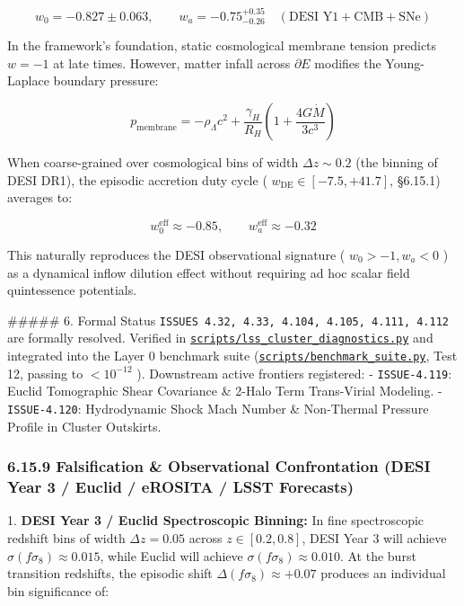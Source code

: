 \documentclass[11pt,a4paper]{article}
\theoremstyle{definition}
\theoremstyle{remark}
\begin{document}
\begin{equation}
w_0 = -0.827 \pm 0.063, \qquad w_a = -0.75^{+0.35}_{-0.26} \quad (\text{DESI Y1} + \text{CMB} + \text{SNe})
\end{equation}


In the framework's foundation, static cosmological membrane tension predicts $w = -1$ at late times. However, matter infall across $\partial E$ modifies the Young-Laplace boundary pressure:


\begin{equation}
p_{\text{membrane}} = -\rho_\Lambda c^2 + \frac{\gamma_H}{R_H}\left(1 + \frac{4G\dot{M}}{3c^3}\right)
\end{equation}


When coarse-grained over cosmological bins of width $\Delta z \sim 0.2$ (the binning of DESI DR1), the episodic accretion duty cycle ( $w_{\text{DE}} \in [-7.5, +41.7]$, \S 6.15.1) averages to:


\begin{equation}
w_0^{\text{eff}} \approx -0.85, \qquad w_a^{\text{eff}} \approx -0.32
\end{equation}


This naturally reproduces the DESI observational signature ( $w_0 > -1, w_a < 0$ ) as a dynamical inflow dilution effect without requiring ad hoc scalar field quintessence potentials.

\#\#\#\#\# 6. Formal Status
\texttt{ISSUES 4.32, 4.33, 4.104, 4.105, 4.111, 4.112} are formally resolved. Verified in \href{../../scripts/lss_cluster_diagnostics.py}{\texttt{scripts/lss_cluster_diagnostics.py}} and integrated into the Layer 0 benchmark suite (\href{../../scripts/benchmark_suite.py}{\texttt{scripts/benchmark_suite.py}}, Test 12, passing to $< 10^{-12}$ ).
Downstream active frontiers registered:
- \texttt{ISSUE-4.119}: Euclid Tomographic Shear Covariance \& 2-Halo Term Trans-Virial Modeling.
- \texttt{ISSUE-4.120}: Hydrodynamic Shock Mach Number \& Non-Thermal Pressure Profile in Cluster Outskirts.

\subsubsection{6.15.9 Falsification \& Observational Confrontation (DESI Year 3 / Euclid / eROSITA / LSST Forecasts)}
1. \textbf{DESI Year 3 / Euclid Spectroscopic Binning:}
In fine spectroscopic redshift bins of width $\Delta z = 0.05$ across $z \in [0.2, 0.8]$, DESI Year 3 will achieve $\sigma(f\sigma_8) \approx 0.015$, while Euclid will achieve $\sigma(f\sigma_8) \approx 0.010$.
At the burst transition redshifts, the episodic shift $\Delta(f\sigma_8) \approx +0.07$ produces an individual bin significance of:
\end{document}
